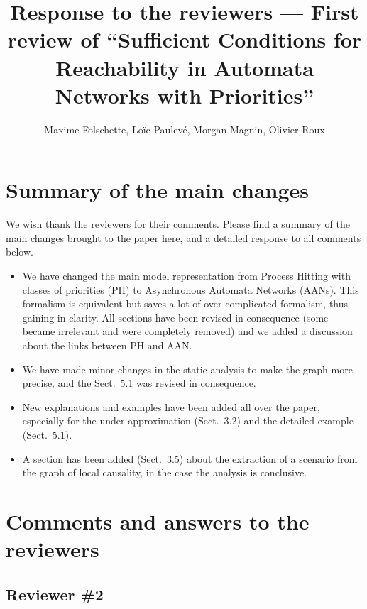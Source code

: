 \documentclass[11pt]{article}
\title{Response to the reviewers --- First review of “Sufficient Conditions for Reachability in Automata Networks with Priorities”}
\author{Maxime Folschette, Loïc Paulevé, Morgan Magnin, Olivier Roux}
\date{}
\newcommand{\answer}[1]{\textcolor{blue}{#1}\vspace*{1em}}
\begin{document}
\maketitle




\section*{Summary of the main changes}

We wish thank the reviewers for their comments.
Please find a summary of the main changes brought to the paper here, and a detailed response to all comments below.

\begin{itemize}
  \item We have changed the main model representation from Process Hitting
    with classes of priorities (PH) to Asynchronous Automata Networks (AANs).
    This formalism is equivalent but saves a lot of over-complicated formalism,
    thus gaining in clarity.
    All sections have been revised in consequence
    (some became irrelevant and were completely removed)
    and we added a discussion about the links between PH and AAN.
  \item We have made minor changes in the static analysis to make the graph more precise,
    and the Sect.~5.1 was revised in consequence.
  \item New explanations and examples have been added all over the paper,
    especially for the under-approximation (Sect.~3.2)
    and the detailed example (Sect.~5.1).
  \item A section has been added (Sect.~3.5) about the extraction of a scenario
    from the graph of local causality, in the case the analysis is conclusive.
\end{itemize}



\section*{Comments and answers to the reviewers}

\subsection*{Reviewer \#2}
\end{document}
